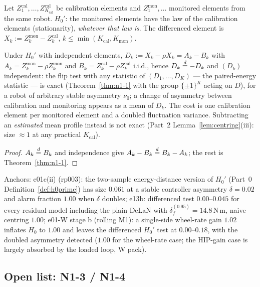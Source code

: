 \begin{definition}
\label{def:h0prime-diff}
Let $Z^{\mathrm{cal}}_1,\dots,Z^{\mathrm{cal}}_{K_{\mathrm{cal}}}$ be
calibration elements and $Z^{\mathrm{mon}}_1, \dots$ monitored elements
from the same robot. $H_0'$: the monitored elements have the law of the
calibration elements (stationarity), \emph{whatever that law is}. The
differenced element is $X_k := Z^{\mathrm{mon}}_k - Z^{\mathrm{cal}}_k$,
$k \le \min(K_{\mathrm{cal}}, K_{\mathrm{mon}})$.
\end{definition}

\begin{proposition}
\label{prop:h0prime-exact}
Under $H_0'$ with independent elements, $D_k := X_k - \rho X_k = A_k - B_k$
with $A_k = Z^{\mathrm{mon}}_k - \rho Z^{\mathrm{mon}}_k$ and $B_k =
Z^{\mathrm{cal}}_k - \rho Z^{\mathrm{cal}}_k$ i.i.d., hence $D_k \overset{d}{=}
-D_k$ and $(D_k)$ independent: the flip test with any statistic of
$(D_1,\dots,D_K)$ --- the paired-energy statistic --- is exact
(Theorem~\ref{thm:n1-1} with the group $\{\pm1\}^K$ acting on $D$), for a
robot of arbitrary stable asymmetry $\nu_0$; a change of asymmetry between
calibration and monitoring appears as a mean of $D_k$. The cost is one
calibration element per monitored element and a doubled fluctuation
variance. Subtracting an \emph{estimated} mean profile instead is not
exact (Part~2 Lemma~\ref{lem:centring}(iii): size $\approx 1$ at any
practical $K_{\mathrm{cal}}$).
\end{proposition}

\begin{proof}
$A_k \overset{d}{=} B_k$ and independence give $A_k - B_k \overset{d}{=} B_k - A_k$; the
rest is Theorem~\ref{thm:n1-1}.
\end{proof}

Anchors: e01c(ii) (rp003): the two-sample energy-distance version of $H_0'$
(Part~0 Definition~\ref{def:h0prime}) has size $0.061$ at a stable
controller asymmetry $\delta = 0.02$ and alarm fraction $1.00$ when $\delta$
doubles; e13b: differenced test $0.00$--$0.045$ for every residual model
including the plain DeLaN with $\delta_f^{(0.95)} = 14.8$\,N\,m, naive
centring $1.00$; e01-W stage b (rolling M1): a single-side wheel-rate gain
$1.02$ inflates $H_0$ to $1.00$ and leaves the differenced $H_0'$ test at
$0.00$--$0.18$, with the doubled asymmetry detected ($1.00$ for the wheel-rate
case; the HIP-gain case is largely absorbed by the loaded loop, W pack).

\subsection{Open list: N1-3 / N1-4}
\label{sec:p1-open}

